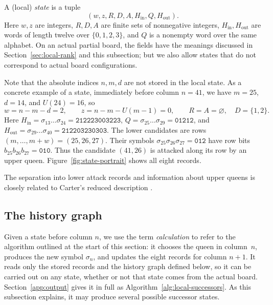 \begin{definition}\label{def:local-state}
A (local) \emph{state} is a tuple
\begin{equation}\label{eq:state}
 (w,z,R,D,A,H_{\mathrm{in}},Q,H_{\mathrm{out}}).
\end{equation}
Here $w,z$ are integers, $R,D,A$ are finite sets of nonnegative
integers, $H_{\mathrm{in}},H_{\mathrm{out}}$ are words of length
twelve over $\{0,1,2,3\}$, and $Q$ is a nonempty word over the
same alphabet. On an actual partial board, the fields have the
meanings discussed in Section~\ref{sec:local-rank} and this subsection;
but we also allow states that do not correspond to actual board
configurations.
\end{definition}
Note that the absolute indices $n,m,d$ are not stored in the local state.
As a concrete example of a state, immediately before column $n=41$,
we have $m=25$, $d=14$, and $U(24)=16$, so
\[
 w=n-m-d=2,\qquad z=n-m-U(m-1)=0,\qquad
 R=A=\varnothing,\quad D=\{1,2\}.
\]
Here $H_{\mathrm{in}}=\sigma_{13}\dots\sigma_{24}=\texttt{212223003223}$,
$Q=\sigma_{25}\dots\sigma_{29}=\mathtt{01212}$, and
$H_{\mathrm{out}}=\sigma_{29}\dots\sigma_{40}=\texttt{212203230303}$.
The lower candidates are rows $(m,\dots,m+w)=(25,26,27)$. Their symbols
$\sigma_{25}\sigma_{26}\sigma_{27}=\texttt{012}$ have row bits
$b_{25}b_{26}b_{27}=\texttt{010}$. Thus the candidate $(41,26)$ is attacked along its row
by an upper queen. Figure~\ref{fig:state-portrait} shows all eight records.


The separation into lower attack records and information about
upper queens is closely related to Carter's reduced description
\cite[Section~5]{Carter}.


\subsection{The history graph}\label{app:graph}
Given a state before column $n$, we use the term 
\emph{calculation} to refer to
the algorithm outlined at the start of this section: it chooses the
queen in column~$n$, produces the new symbol $\sigma_n$, and updates
the eight records for column $n+1$. It reads only the stored records
and the history graph defined below, so it can be carried out on any
state, whether or not that state comes from the actual board.
Section~\ref{app:output} gives it in full as
Algorithm~\ref{alg:local-successors}. As this subsection explains,
it may produce several possible successor states.

